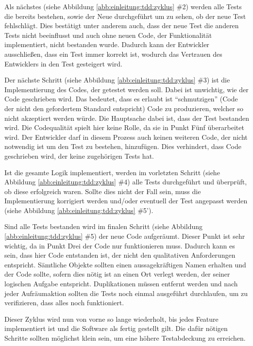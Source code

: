 Als nächstes (siehe Abbildung \ref{abb:einleitung:tdd:zyklus} \#2) werden alle
Tests die bereits bestehen, sowie der Neue durchgeführt um zu sehen, ob der
neue Test fehlschlägt. Dies bestätigt unter anderem auch, dass der neue Test
die anderen Tests nicht beeinflusst und auch ohne neuen Code, der
Funktionalität implementiert, nicht bestanden wurde. Dadurch kann der
Entwickler ausschließen, dass ein Test immer korrekt ist, wodurch das Vertrauen
des Entwicklers in den Test gesteigert wird.

Der nächste Schritt (siehe Abbildung \ref{abb:einleitung:tdd:zyklus} \#3) ist
die Implementierung des Codes, der getestet werden soll. Dabei ist unwichtig,
wie der Code geschrieben wird. Das bedeutet, dass es erlaubt ist
"`schmutzigen"' (Code der nicht den gefordertem Standard entspricht) Code zu
produzieren, welcher so nicht akzeptiert werden würde. Die Hauptsache dabei
ist, dass der Test bestanden wird. Die Codequalität spielt hier keine Rolle, da
sie in Punkt Fünf überarbeitet wird. Der Entwickler darf in diesem Prozess auch
keinen weiteren Code, der nicht notwendig ist um den Test zu bestehen,
hinzufügen. Dies verhindert, dass Code geschrieben wird, der keine zugehörigen
Tests hat.

Ist die gesamte Logik implementiert, werden im vorletzten Schritt (siehe 
Abbildung \ref{abb:einleitung:tdd:zyklus} \#4) alle Tests durchgeführt
und überprüft, ob diese erfolgreich waren. Sollte dies nicht der Fall sein,
muss die Implementierung korrigiert werden und/oder eventuell der Test 
angepasst werden (siehe Abbildung \ref{abb:einleitung:tdd:zyklus} \#5').

Sind alle Tests bestanden wird im finalen Schritt (siehe Abbildung 
\ref{abb:einleitung:tdd:zyklus} \#5) der neue Code aufgeräumt.
Dieser Punkt ist sehr wichtig, da in Punkt Drei der Code nur funktionieren 
muss. Dadurch kann es sein, dass hier Code entstanden ist, der nicht den 
qualitativen Anforderungen entspricht. Sämtliche Objekte sollten einen 
aussagekräftigen Namen erhalten und der Code sollte, sofern dies nötig ist an 
einen Ort verlegt werden, der seiner logischen Aufgabe entspricht. 
Duplikationen müssen entfernt werden und nach jeder Aufräumaktion sollten die 
Tests noch einmal ausgeführt durchlaufen, um zu verifizieren, dass alles noch 
funktioniert.
\newline

Dieser Zyklus wird nun von vorne so lange wiederholt, bis jedes Feature 
implementiert ist und die Software als fertig gestellt gilt. Die dafür nötigen 
Schritte sollten möglichst klein sein, um eine höhere Testabdeckung zu 
erreichen.